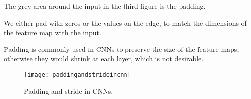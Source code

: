 	\begin{bulletedlist}
		\item The grey area around the input in the third figure is the padding.
		\item We either pad with zeros or the values on the edge, to match the dimensions of the feature map with the input.
		\item Padding is commonly used in CNNs to preserve the size of the feature maps, otherwise they would shrink at each layer, which is not desirable.
	\end{bulletedlist}

	\begin{figure}[h]
		\centering
		\texttt{[image: paddingandstrideincnn]}
		\caption[Padding and stride in CNNs]{Padding and stride in CNNs.}
		\label{fig:paddingandstrideincnn}
	\end{figure}

